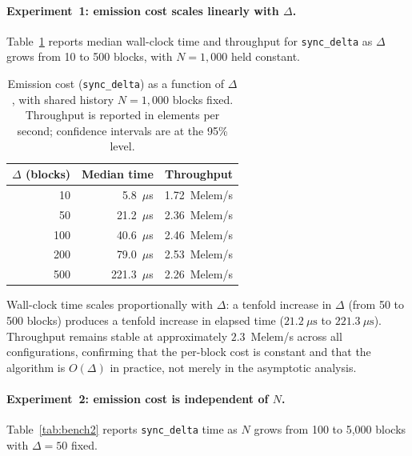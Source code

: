 \documentclass[12pt]{article}
\begin{document}
	\paragraph{Experiment~1: emission cost scales linearly with $\Delta$.}
	
	Table~\ref{tab:bench1} reports median wall-clock time and throughput
	for \texttt{sync\_delta} as $\Delta$ grows from 10 to 500 blocks,
	with $N = 1{,}000$ held constant.
	
	\begin{table}[h]
		\centering
		\caption{Emission cost (\texttt{sync\_delta}) as a function of
			$\Delta$, with shared history $N = 1{,}000$ blocks fixed.
			Throughput is reported in elements per second; confidence
			intervals are at the 95\% level.}
		\label{tab:bench1}
		\small
		\begin{tabular}{@{} r r r @{}}
			\toprule
			$\Delta$ (blocks) & Median time & Throughput \\
			\midrule
			10  & \phantom{0}5.8~$\mu$s  & 1.72~Melem/s \\
			50  & 21.2~$\mu$s            & 2.36~Melem/s \\
			100 & 40.6~$\mu$s            & 2.46~Melem/s \\
			200 & 79.0~$\mu$s            & 2.53~Melem/s \\
			500 & 221.3~$\mu$s           & 2.26~Melem/s \\
			\bottomrule
		\end{tabular}
	\end{table}
	
	Wall-clock time scales proportionally with $\Delta$: a tenfold
	increase in $\Delta$ (from 50 to 500 blocks) produces a tenfold
	increase in elapsed time ($21.2~\mu\text{s}$ to $221.3~\mu\text{s}$).
	Throughput remains stable at approximately $2.3$~Melem/s across all
	configurations, confirming that the per-block cost is constant and
	that the algorithm is $O(\Delta)$ in practice, not merely in the
	asymptotic analysis.
	
	\paragraph{Experiment~2: emission cost is independent of $N$.}
	
	Table~\ref{tab:bench2} reports \texttt{sync\_delta} time as $N$
	grows from 100 to 5{,}000 blocks with $\Delta = 50$ fixed.
	
\end{document}
